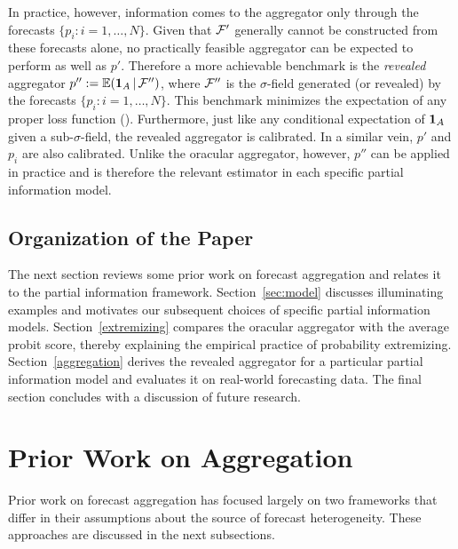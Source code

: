 \documentclass[11pt]{article}
\newcommand{\E}{\mathbb{E}}
\theoremstyle{definition}
\theoremstyle{definition}
\def\one{{\bf 1}}
\def\F{{\cal F}}
\def\E{{\mathbb E}}
\def\|{\, | \,}
\begin{document}
In practice, however, information comes to the
aggregator only through the forecasts $\{p_i : i = 1, \dots, N\}$. Given that $\F'$ generally cannot be constructed from these forecasts alone, no practically feasible aggregator can be expected to perform as well as $p'$.  Therefore a more achievable benchmark is the \textit{revealed} aggregator $p'' := \E (\one_A \|
\F'')$, where $\F''$ is the $\sigma$-field generated (or revealed) by the forecasts
$\{ p_i : i = 1, \dots, N \}$. This benchmark minimizes
the expectation of any proper loss function (\citealt{Ranjan08}). Furthermore, just like any conditional expectation of $\one_A$ given a sub-$\sigma$-field, the revealed aggregator is calibrated. In a similar vein, $p'$ and $p_i$ are also calibrated. Unlike the oracular aggregator, however, $p''$ can be applied in practice and is therefore the relevant estimator in each specific partial information model. 


\subsection{Organization of the Paper}

The next section reviews some prior work on forecast aggregation and relates it to the partial information framework.
Section~\ref{sec:model} discusses illuminating examples and
motivates our subsequent choices of specific partial information
models.  Section~\ref{extremizing} compares the oracular aggregator with the average probit score, thereby explaining the
empirical practice of probability extremizing.
Section~\ref{aggregation} derives the revealed aggregator for a
particular partial information model and evaluates it on real-world
forecasting data.  The final section concludes with a discussion of
future research.



\section{Prior Work on Aggregation}
\label{sec:prior}
Prior work on forecast aggregation has focused largely on two frameworks that differ in their assumptions about the source of forecast heterogeneity.  These approaches are discussed in the next subsections.
\end{document}
